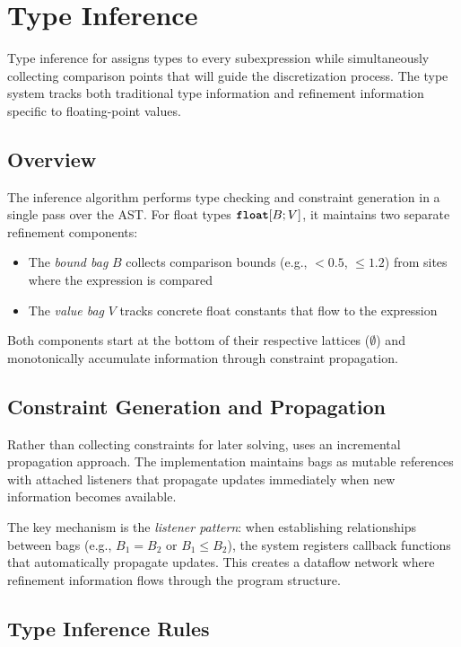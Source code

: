 \section{Type Inference}\label{sec:type-inference}

Type inference for \Slice{} assigns types to every subexpression while simultaneously collecting comparison points that will guide the discretization process. The type system tracks both traditional type information and refinement information specific to floating-point values.

\subsection{Overview}

The inference algorithm performs type checking and constraint generation in a single pass over the AST. For float types $\text{\ttfamily\bfseries float}[B; V]$, it maintains two separate refinement components:
\begin{itemize}
    \item The \emph{bound bag} $B$ collects comparison bounds (e.g., $<0.5$, $\leq 1.2$) from sites where the expression is compared
    \item The \emph{value bag} $V$ tracks concrete float constants that flow to the expression
\end{itemize}

Both components start at the bottom of their respective lattices ($\emptyset$) and monotonically accumulate information through constraint propagation.

\subsection{Constraint Generation and Propagation}

Rather than collecting constraints for later solving, \Slice{} uses an incremental propagation approach. The implementation maintains bags as mutable references with attached listeners that propagate updates immediately when new information becomes available.

The key mechanism is the \emph{listener pattern}: when establishing relationships between bags (e.g., $B_1 = B_2$ or $B_1 \leq B_2$), the system registers callback functions that automatically propagate updates. This creates a dataflow network where refinement information flows through the program structure.

\subsection{Type Inference Rules}

